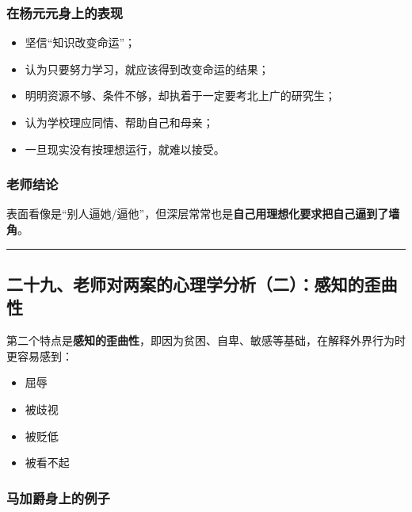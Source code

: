\documentclass[
  chinese,
  9pt,
  a4paper,
]{ctexart}
\providecommand{\tightlist}{%
  \setlength{\itemsep}{0pt}\setlength{\parskip}{0pt}}
\begin{document}
\subsubsection{在杨元元身上的表现}\label{ux5728ux6768ux5143ux5143ux8eabux4e0aux7684ux8868ux73b0}

\begin{itemize}
\tightlist
\item
  坚信``知识改变命运''；
\item
  认为只要努力学习，就应该得到改变命运的结果；
\item
  明明资源不够、条件不够，却执着于一定要考北上广的研究生；
\item
  认为学校理应同情、帮助自己和母亲；
\item
  一旦现实没有按理想运行，就难以接受。
\end{itemize}

\subsubsection{老师结论}\label{ux8001ux5e08ux7ed3ux8bba-1}

表面看像是``别人逼她/逼他''，但深层常常也是\textbf{自己用理想化要求把自己逼到了墙角}。

\begin{center}\rule{0.5\linewidth}{0.5pt}\end{center}

\subsection{二十九、老师对两案的心理学分析（二）：感知的歪曲性}\label{ux4e8cux5341ux4e5dux8001ux5e08ux5bf9ux4e24ux6848ux7684ux5fc3ux7406ux5b66ux5206ux6790ux4e8cux611fux77e5ux7684ux6b6aux66f2ux6027}

第二个特点是\textbf{感知的歪曲性}，即因为贫困、自卑、敏感等基础，在解释外界行为时更容易感到：

\begin{itemize}
\tightlist
\item
  屈辱
\item
  被歧视
\item
  被贬低
\item
  被看不起
\end{itemize}

\subsubsection{马加爵身上的例子}\label{ux9a6cux52a0ux7235ux8eabux4e0aux7684ux4f8bux5b50}
\end{document}
